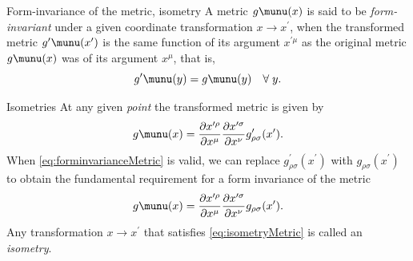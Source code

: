 \begin{mybox}{Form-invariance of the metric, isometry}
	A metric $g\munu(x)$ is said to be \emph{form-invariant} under a given coordinate transformation $x \rightarrow x^\prime$, when the transformed metric $g^\prime\munu(x^\prime)$ is the same function of its argument $x^{\prime \mu}$ as the original metric $g\munu(x)$ was of its argument $x^\mu$, that is,
	\begin{equation}
	\label{eq:forminvarianceMetric}
	g^\prime \munu(y) = g\munu(y) \quad \forall \; y.
	\end{equation}
\end{mybox}
\begin{mybox}{Isometries}
	At any given \emph{point} the transformed metric is given by
	\begin{equation}
		g\munu(x) = \frac{\partial x^{\prime \rho}}{\partial x^\mu} \frac{\partial x^{\prime \sigma}}{\partial x^\nu} g^\prime_{\rho \sigma} (x^\prime).
	\end{equation}
		When \ref{eq:forminvarianceMetric} is valid, we can replace $g^\prime_{\rho \sigma} (x^\prime)$ with $g_{\rho \sigma}(x^\prime)$ to obtain the fundamental requirement for a form invariance of the metric
		\begin{equation}
			\label{eq:isometryMetric}
			g\munu(x) = \frac{\partial x^{\prime \rho}}{\partial x^\mu} \frac{\partial x^{\prime \sigma}}{\partial x^\nu} g_{\rho \sigma}(x^\prime).
		\end{equation}
		Any transformation $x\rightarrow x^\prime$ that satisfies \ref{eq:isometryMetric} is called an \emph{isometry}.
\end{mybox}
